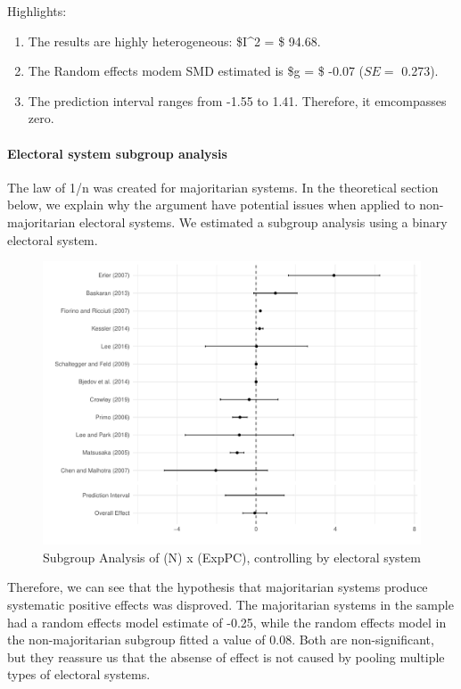 \documentclass[
]{article}
\providecommand{\tightlist}{%
  \setlength{\itemsep}{0pt}\setlength{\parskip}{0pt}}
\begin{document}
Highlights:

\begin{enumerate}
\def\labelenumi{\arabic{enumi}.}
\tightlist
\item
  The results are highly heterogeneous: \$I\^{}2 = \$ 94.68.
\item
  The Random effects modem SMD estimated is \$g = \$ -0.07 (\(SE =\)
  0.273).
\item
  The prediction interval ranges from -1.55 to 1.41. Therefore, it
  emcompasses zero.
\end{enumerate}

\newpage

\hypertarget{electoral-system-subgroup-analysis}{%
\paragraph{Electoral system subgroup
analysis}\label{electoral-system-subgroup-analysis}}

The law of 1/n was created for majoritarian systems. In the theoretical
section below, we explain why the argument have potential issues when
applied to non-majoritarian electoral systems. We estimated a subgroup
analysis using a binary electoral system.

\begin{figure}
\centering
\includegraphics{appendixV5_files/figure-latex/unnamed-chunk-17-1.pdf}
\caption{Subgroup Analysis of (N) x (ExpPC), controlling by electoral
system}
\end{figure}

Therefore, we can see that the hypothesis that majoritarian systems
produce systematic positive effects was disproved. The majoritarian
systems in the sample had a random effects model estimate of -0.25,
while the random effects model in the non-majoritarian subgroup fitted a
value of 0.08. Both are non-significant, but they reassure us that the
absense of effect is not caused by pooling multiple types of electoral
systems.
\end{document}
